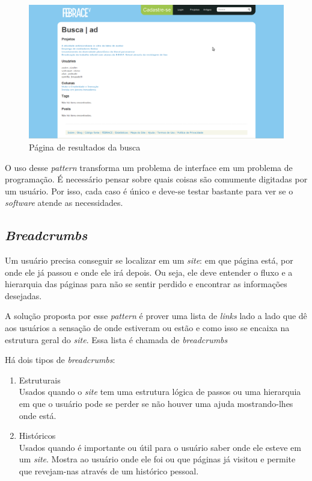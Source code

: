     \begin{figure}[h]
        \begin{center}
    \includegraphics[width=1.0\linewidth]{arquivos/forgiving_formats.png}
        \end{center}
        \caption{Página de resultados da busca}
        \label{forgiving_formats}
    \end{figure}

O uso desse \textit{pattern} transforma um problema de interface em um problema de programação. É necessário pensar sobre quais coisas são comumente digitadas por um usuário. Por isso, cada caso é único e deve-se testar bastante para ver se o \textit{software} atende as necessidades.

\subsection{\textit{Breadcrumbs}}

Um usuário precisa conseguir se localizar em um \textit{site}: em que página está, por onde ele já passou e onde ele irá depois. Ou seja, ele deve entender o fluxo e a hierarquia das páginas para não se sentir perdido e encontrar as informações desejadas.

A solução proposta por esse \textit{pattern} é prover uma lista de \textit{links} lado a lado que dê aos usuários a sensação de onde estiveram ou estão e como isso se encaixa na estrutura geral do \textit{site}. Essa lista é chamada de \textit{breadcrumbs}

Há dois tipos de \textit{breadcrumbs}:

    \begin{enumerate}
        \item Estruturais \\
            Usados quando o \textit{site} tem uma estrutura lógica de passos ou uma hierarquia em que o usuário pode se perder se não houver uma ajuda mostrando-lhes onde está.
        \item Históricos \\
            Usados quando é importante ou útil para o usuário saber onde ele esteve em um \textit{site}. Mostra ao usuário onde ele foi ou que páginas já visitou e permite que revejam-nas através de um histórico pessoal.
    \end{enumerate}

